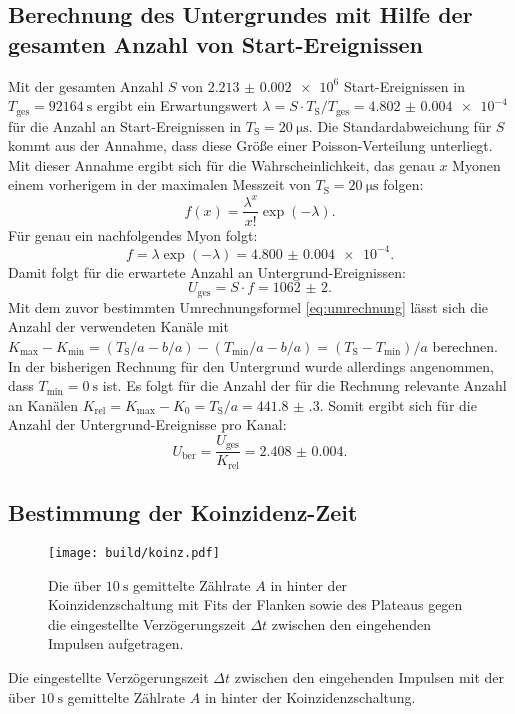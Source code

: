 \subsection{Berechnung des Untergrundes mit Hilfe der gesamten Anzahl von Start-Ereignissen}
\label{subsec:Berechnung}
Mit der gesamten Anzahl $S$ von $\num{2.213(2)e6}$ Start-Ereignissen in $T_\text{ges}=\SI{92164}{\second}$ ergibt ein Erwartungswert $\lambda=S \cdot T_\text{S}/T_\text{ges}=\num{4.802(4)e-4}$ für die Anzahl an Start-Ereignissen in $T_\text{S}=\SI{20}{\micro\second}$. Die Standardabweichung für $S$ kommt aus der Annahme, dass diese Größe einer Poisson-Verteilung unterliegt. Mit dieser Annahme ergibt sich für die Wahrscheinlichkeit, das genau $x$ Myonen einem vorherigem in der maximalen Messzeit von $T_\text{S}=\SI{20}{\micro\second}$ folgen: 
\begin{displaymath}
f(x)=\frac{\lambda^x}{x!}\exp(-\lambda).
\end{displaymath}
Für genau ein nachfolgendes Myon folgt:
\begin{displaymath}
f=\lambda\exp(-\lambda)=\num{4.800(4)e-4}.
\end{displaymath}
Damit folgt für die erwartete Anzahl an Untergrund-Ereignissen:
\begin{displaymath}
U_\text{ges}=S \cdot f =\num{1062(2)}.
\end{displaymath}
Mit dem zuvor bestimmten Umrechnungsformel \eqref{eq:umrechnung} lässt sich die Anzahl der verwendeten Kanäle mit $K_\text{max}-K_\text{min}=(T_\text{S}/a -b/a)-(T_\text{min}/a-b/a)= (T_\text{S}-T_\text{min})/a$ berechnen. In der bisherigen Rechnung für den Untergrund wurde allerdings angenommen, dass $T_\text{min} = \SI{0}{\second}$ ist. Es folgt für die Anzahl der für die Rechnung relevante Anzahl an Kanälen $K_\text{rel}=K_\text{max}-K_0= T_\text{S}/a=\num{441.8(3)}$.
Somit ergibt sich für die Anzahl der Untergrund-Ereignisse pro Kanal:
\begin{displaymath}
U_\text{ber}=\frac{U_\text{ges}}{K_\text{rel}} =\num{2.408(4)}.
\end{displaymath}

\subsection{Bestimmung der Koinzidenz-Zeit}
\label{subsec:Koinzidenz}
\begin{figure}
	\centering
	\texttt{[image: build/koinz.pdf]}
	\caption{Die über $\SI{10}{\second}$ gemittelte Zählrate $A$ in hinter der Koinzidenzschaltung mit Fits der Flanken sowie des Plateaus gegen die eingestellte Verzögerungszeit $\varDelta t$ zwischen den eingehenden Impulsen aufgetragen.}
	\label{fig:zweite}
\end{figure}
\begin{table}
	\centering
	\caption{Die eingestellte Verzögerungszeit $\varDelta t$ zwischen den eingehenden Impulsen mit der über $\SI{10}{\second}$ gemittelte Zählrate $A$ in hinter der Koinzidenzschaltung.}
	
\end{table}

